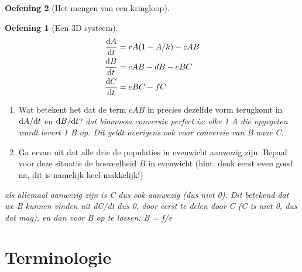 \documentclass[
  a4paper,
]{scrbook}
\theoremstyle{definition}
\newtheorem{exercise}{Oefening}[chapter]
\theoremstyle{remark}
\begin{document}
\begin{exercise}[Het mengen van een
kringloop]
\begin{exercise}[Een 3D
systeem]
\begin{align*}
\mathchoice{\frac{\mathrm{d}A}
{\mathrm{d}t}}{\mathrm{d}A/\mathrm{d}t}
{\mathrm{d}A/\mathrm{d}t}
{\mathrm{d}A/\mathrm{d}t} &= rA(1-A/k)-cAB \\
\mathchoice{\frac{\mathrm{d}B}
{\mathrm{d}t}}{\mathrm{d}B/\mathrm{d}t}
{\mathrm{d}B/\mathrm{d}t}
{\mathrm{d}B/\mathrm{d}t} &= cAB - dB - eBC \\
\mathchoice{\frac{\mathrm{d}C}
{\mathrm{d}t}}{\mathrm{d}C/\mathrm{d}t}
{\mathrm{d}C/\mathrm{d}t}
{\mathrm{d}C/\mathrm{d}t} &= eBC - fC
\end{align*}

\begin{enumerate}
\def\labelenumi{\alph{enumi}.}
\item
  Wat betekent het dat de term \(cAB\) in precies dezelfde vorm
  terugkomt in \(\mathchoice{\frac{\mathrm{d}A}
  {\mathrm{d}t}}{\mathrm{d}A/\mathrm{d}t}
  {\mathrm{d}A/\mathrm{d}t}
  {\mathrm{d}A/\mathrm{d}t}\) en \(\mathchoice{\frac{\mathrm{d}B}
  {\mathrm{d}t}}{\mathrm{d}B/\mathrm{d}t}
  {\mathrm{d}B/\mathrm{d}t}
  {\mathrm{d}B/\mathrm{d}t}\)? \emph{dat biomassa conversie perfect is:
  elke 1 A die opgegeten wordt levert 1 B op. Dit geldt overigens ook
  voor conversie van B naar C.}
\item
  Ga ervan uit dat alle drie de populaties in evenwicht aanwezig zijn.
  Bepaal voor deze situatie de hoeveelheid \(B\) in evenwicht (hint:
  denk eerst even goed na, dit is namelijk heel makkelijk!)
\end{enumerate}

\emph{als allemaal aanwezig zijn is C dus ook aanwezig (dus niet 0). Dit
betekend dat we B kunnen vinden uit dC/dt dus 0, door eerst te delen
door C (C is niet 0, dus dat mag), en dan voor B op te lossen: B = f/e}

\end{exercise}

\section{Terminologie}\label{terminologie-5}


\end{exercise}
\end{document}

